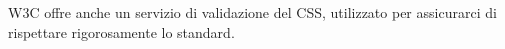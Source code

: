 W3C offre anche un servizio di validazione del CSS, utilizzato per assicurarci di rispettare rigorosamente lo standard.